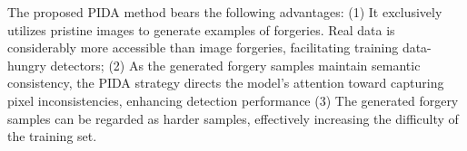 \documentclass[10pt,journal,compsoc]{IEEEtran}
\begin{document}
The proposed PIDA method bears the following advantages: (1) It exclusively utilizes pristine images to generate examples of forgeries. Real data is considerably more accessible than image forgeries, facilitating training data-hungry detectors; (2) As the generated forgery samples maintain semantic consistency, the PIDA strategy directs the model's attention toward capturing pixel inconsistencies, enhancing detection performance (3) The generated forgery samples can be regarded as harder samples, effectively increasing the difficulty of the training set.

 
\end{document}
